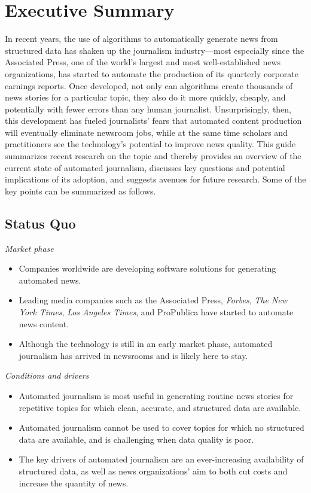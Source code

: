 \documentclass[notoc, symmetric, nobib, nols]{towcenter-guideto-book}
\begin{document}
\cleardoublepage


\mainmatter
\chapter{Executive Summary}

In recent years, the use of algorithms to automatically generate news from structured data has shaken up the journalism industry---most especially since the Associated Press, one of the world's largest and most well-established news organizations, has started to automate the production of its quarterly corporate earnings reports. Once developed, not only can algorithms create thousands of news stories for a particular topic, they also do it more quickly, cheaply, and potentially with fewer errors than any human journalist. Unsurprisingly, then, this development has fueled journalists' fears that automated content production will eventually eliminate newsroom jobs, while at the same time scholars and practitioners see the technology's potential to improve news quality. This guide summarizes recent research on the topic and thereby provides an overview of the current state of automated journalism, discusses key questions and potential implications of its adoption, and suggests avenues for future research. Some of the key points can be summarized as follows.

\section{Status Quo}

\textit{Market phase} 
\begin{itemize}
\item Companies worldwide are developing software solutions for generating automated news.
\item Leading media companies such as the Associated Press, \textit{Forbes}, \textit{The New York Times}, \textit{Los Angeles Times}, and ProPublica have started to automate news content.
\item Although the technology is still in an early market phase, automated journalism has arrived in newsrooms and is likely here to stay. 
\end{itemize}

\textit{Conditions and drivers}
\begin{itemize}
\item Automated journalism is most useful in generating routine news stories for repetitive topics for which clean, accurate, and structured data are available. 
\item Automated journalism cannot be used to cover topics for which no structured data are available, and is challenging when data quality is poor. 
\item The key drivers of automated journalism are an ever-increasing availability of structured data, as well as news organizations' aim to both cut costs and increase the quantity of news.
\end{itemize}
\end{document}

